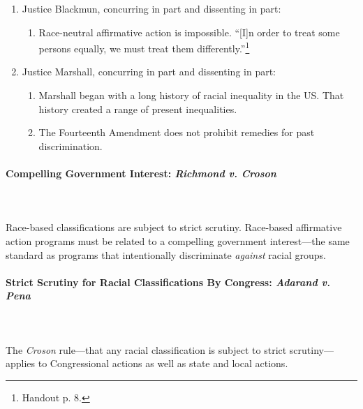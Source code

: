 \begin{enumerate}
    \item Justice Blackmun, concurring in part and dissenting in part:
    \begin{enumerate}
        \item Race-neutral affirmative action is impossible. ``[I]n order to 
        treat some persons equally, we must treat them 
        differently.''\footnote{Handout p. 8.}
    \end{enumerate}
    \item Justice Marshall, concurring in part and dissenting in part:
    \begin{enumerate}
        \item Marshall began with a long history of racial inequality in the 
        US. That history created a range of present inequalities.
        \item The Fourteenth Amendment does not prohibit remedies for past 
        discrimination.
    \end{enumerate}
\end{enumerate}

\paragraph{Compelling Government Interest: \emph{Richmond v. Croson}}
~\\\\
Race-based classifications are subject to strict scrutiny. Race-based 
affirmative action programs must be related to a compelling government 
interest---the same standard as programs that intentionally discriminate 
\emph{against} racial groups.


\paragraph{Strict Scrutiny for Racial Classifications By Congress: 
\emph{Adarand v. Pena}}
~\\\\
The \emph{Croson} rule---that any racial classification is subject to strict 
scrutiny---applies to Congressional actions as well as state and local 
actions.

% 
